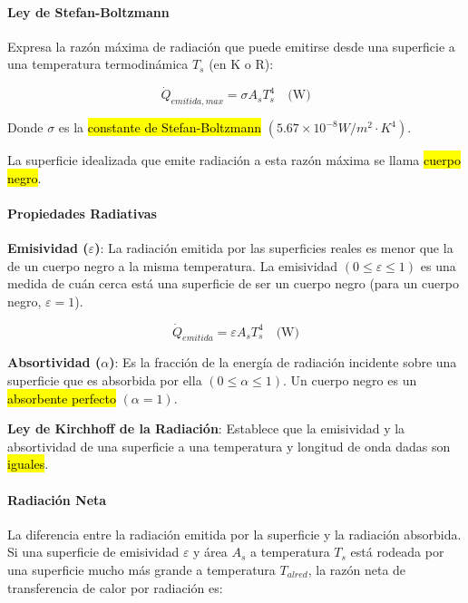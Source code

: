 \documentclass{article}
\begin{document}
    \paragraph{Ley de Stefan-Boltzmann}

    Expresa la razón máxima de radiación que puede emitirse desde una superficie a una temperatura termodinámica $T_s$ (en K o R):

    \begin{equation}
    \dot{Q}_{emitida,max} = \sigma A_s T_s^4 \quad \text{(W)}
    \end{equation}

    Donde $\sigma$ es la \hl{constante de Stefan-Boltzmann} $(5.67 \times 10^{-8} W/m^2·K^4)$.

    La superficie idealizada que emite radiación a esta razón máxima se llama \hl{cuerpo negro}.

    \paragraph{Propiedades Radiativas}

    \textbf{Emisividad ($\varepsilon$)}: La radiación emitida por las superficies reales es menor que la de un cuerpo negro a la misma temperatura. La emisividad $(0 \leq \varepsilon \leq 1)$ es una medida de cuán cerca está una superficie de ser un cuerpo negro (para un cuerpo negro, $\varepsilon = 1$).

    \begin{equation}
    \dot{Q}_{emitida} = \varepsilon A_s T_s^4 \quad \text{(W)}
    \end{equation}

    \textbf{Absortividad ($\alpha$)}: Es la fracción de la energía de radiación incidente sobre una superficie que es absorbida por ella $(0 \leq \alpha \leq 1)$. Un cuerpo negro es un \hl{absorbente perfecto} $(\alpha = 1)$.

    \textbf{Ley de Kirchhoff de la Radiación}: Establece que la emisividad y la absortividad de una superficie a una temperatura y longitud de onda dadas son \hl{iguales}.

    \paragraph{Radiación Neta}

    La diferencia entre la radiación emitida por la superficie y la radiación absorbida. Si una superficie de emisividad $\varepsilon$ y área $A_s$ a temperatura $T_s$ está rodeada por una superficie mucho más grande a temperatura $T_{alred}$, la razón neta de transferencia de calor por radiación es:
\end{document}
